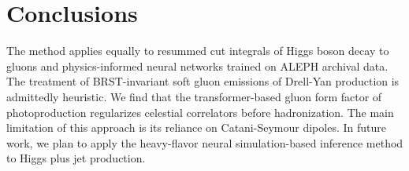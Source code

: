\section{Conclusions}\label{sec:conclusions}

The method applies equally to resummed cut integrals of Higgs boson
decay to gluons and physics-informed neural networks trained on ALEPH
archival data. The treatment of BRST-invariant soft gluon emissions of
Drell-Yan production is admittedly heuristic. We find that the
transformer-based gluon form factor of photoproduction regularizes
celestial correlators before hadronization. The main limitation of this
approach is its reliance on Catani-Seymour dipoles. In future work, we
plan to apply the heavy-flavor neural simulation-based inference method
to Higgs plus jet production.

